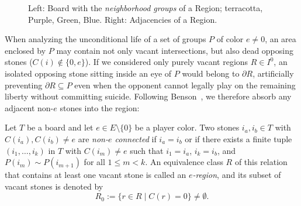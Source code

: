 \begin{figure}[H]
	\centering
	\begin{goban}[7, hoshi = false]
	\end{goban}
	\begin{goban}[7, hoshi = false]
	\end{goban}
	\caption{Left: Board with the \textit{neighborhood groups} of a \textcolor{sealred}{Region}; \textcolor{terracotta}{terracotta}, \textcolor{amethyst}{Purple}, \textcolor{Moss}{Green}, \textcolor{bg}{Blue}. Right: \textcolor{Moss}{Adjacencies} of a \textcolor{sealred}{Region}.}
	\label{fig:dif_k_partial}
\end{figure}

When analyzing the unconditional life of a set of groups $P$ of color $e \neq 0$, an area enclosed by $P$ may contain not only vacant intersections, but also dead opposing stones ($C(i) \notin \{0, e\}$). If we considered only purely vacant regions $R \in I^0$, an isolated opposing stone sitting inside an eye of $P$ would belong to $\partial R$, artificially preventing $\partial R \subseteq P$ even when the opponent cannot legally play on the remaining liberty without committing suicide. Following Benson~\cite{Benson}, we therefore absorb any adjacent non-$e$ stones into the region:

\begin{definition}[$e$-Region]\label{def:e_region}
	Let $T$ be a board and let $e \in E \setminus \{0\}$ be a player color. Two stones $i_a, i_b \in T$ with $C(i_a), C(i_b) \neq e$ are \emph{non-$e$ connected} if $i_a = i_b$ or if there exists a finite tuple $(i_1, \dots, i_k)$ in $T$ with $C(i_m) \neq e$ such that $i_1 = i_a$, $i_k = i_b$, and $P(i_m) \sim P(i_{m+1})$ for all $1 \le m < k$. An equivalence class $R$ of this relation that contains at least one vacant stone is called an \emph{$e$-region}, and its subset of vacant stones is denoted by
	\[
	R_0 := \{ r \in R \mid C(r) = 0 \} \neq \emptyset.
	\]
\end{definition}

